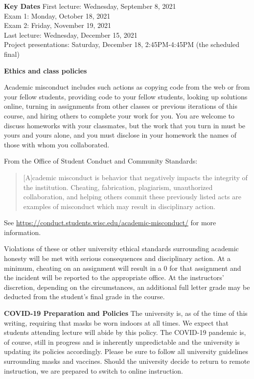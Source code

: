 \documentclass[11pt,oneside]{amsart}
\newcommand{\header}[1]{\bigbreak\textbf{#1}}
\begin{document}
\header{Key Dates}
First lecture: Wednesday, September 8, 2021 \\

Exam 1: Monday, October 18, 2021 \\

Exam 2: Friday, November 19, 2021 \\

Last lecture: Wednesday, December 15,  2021 \\

Project presentations: Saturday, December 18, 2:45PM-4:45PM (the scheduled final)

\header{Ethics and class policies}

Academic misconduct includes such actions as
copying code from the web or from your fellow students,
providing code to your fellow students, looking up solutions online,
turning in assignments from other classes or previous iterations of
this course, and hiring others to complete your work for you.
You are welcome to discuss homeworks with your classmates,
but the work that you turn in must be yours and yours alone,
and you must disclose in your homework
the names of those with whom you collaborated.

From the Office of Student Conduct and Community Standards:
\begin{quote} \small
[A]cademic misconduct is behavior that negatively impacts the integrity of the institution. Cheating, fabrication, plagiarism, unauthorized collaboration, and helping others commit these previously listed acts are examples of misconduct which may result in disciplinary action.
\end{quote}
See {\small \url{https://conduct.students.wisc.edu/academic-misconduct/}}
for more information.

Violations of these or other university ethical standards surrounding academic honesty will be met with serious consequences and disciplinary action.
At a minimum, cheating on an assignment will result in a 0 for that
assignment and the incident will be reported to the appropriate office.
At the instructors' discretion, depending on the circumstances,
an additional full letter grade may be deducted from the student's final
grade in the course.

\header{COVID-19 Preparation and Policies}
The university is, as of the time of this writing, requiring that masks be worn indoors at all times.
We expect that students attending lecture will abide by this policy.
The COVID-19 pandemic is, of course, still in progress and is inherently unpredictable and the university is updating its policies accordingly.
Please be sure to follow all university guidelines surrounding masks and vaccines.
Should the university decide to return to remote instruction, we are prepared to switch to online instruction.
\end{document}

